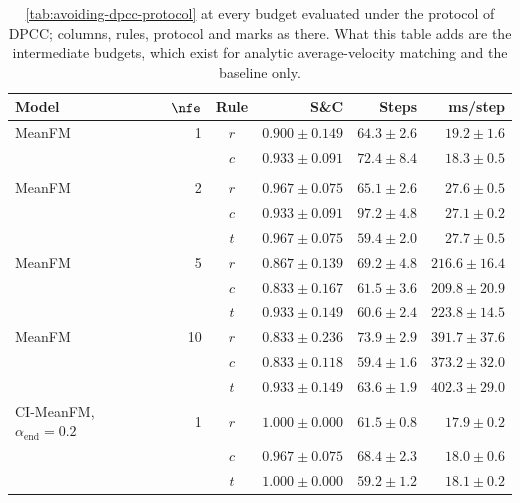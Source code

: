 \begin{table}[htpb]
  \caption[D3IL-avoiding at the protocol of DPCC, every budget]{\autoref{tab:avoiding-dpcc-protocol} at
  every budget evaluated under the protocol of \ac{DPCC}; columns, rules, protocol and marks as there.
  What this table adds are the intermediate budgets, which exist for analytic average-velocity matching
  and the baseline only.}
  \label{tab:app:avoiding-dpcc-full}
  \centering
  \footnotesize
  \begin{tabularx}{\linewidth}{@{}L r c rrr@{}}
    \toprule
    Model & $\nfe$ & Rule & S\&C & Steps & ms/step \\
    \midrule
    MeanFM     & 1 & $r$ & $0.900 \pm 0.149$ & $64.3 \pm 2.6$ & $19.2 \pm 1.6$ \\
                     &    & $c$ & $0.933 \pm 0.091$ & $72.4 \pm 8.4$ & $18.3 \pm 0.5$ \\
                     &    &  &  &  &   \\
    MeanFM     & 2 & $r$ & $0.967 \pm 0.075$ & $65.1 \pm 2.6$ & $27.6 \pm 0.5$ \\
                     &    & $c$ & $0.933 \pm 0.091$ & $97.2 \pm 4.8$ & $27.1 \pm 0.2$ \\
                     &    & $t$ & $0.967 \pm 0.075$ & $59.4 \pm 2.0$ & $27.7 \pm 0.5$ \\
    MeanFM     & 5 & $r$ & $0.867 \pm 0.139$ & $69.2 \pm 4.8$ & $216.6 \pm 16.4$ \\
                     &    & $c$ & $0.833 \pm 0.167$ & $61.5 \pm 3.6$ & $209.8 \pm 20.9$ \\
                     &    & $t$ & $0.933 \pm 0.149$ & $60.6 \pm 2.4$ & $223.8 \pm 14.5$ \\
    MeanFM     & 10 & $r$ & $0.833 \pm 0.236$ & $73.9 \pm 2.9$ & $391.7 \pm 37.6$ \\
                     &    & $c$ & $0.833 \pm 0.118$ & $59.4 \pm 1.6$ & $373.2 \pm 32.0$ \\
                     &    & $t$ & $0.933 \pm 0.149$ & $63.6 \pm 1.9$ & $402.3 \pm 29.0$ \\
    \midrule
    CI-MeanFM, $\alpha_{\mathrm{end}}=0.2$ & 1 & $r$ & $1.000 \pm 0.000$ & $61.5 \pm 0.8$ & $17.9 \pm 0.2$ \\
                     &    & $c$ & $0.967 \pm 0.075$ & $68.4 \pm 2.3$ & $18.0 \pm 0.6$ \\
                     &    & \textbf{$t$} & \textbf{$1.000 \pm 0.000$} & \textbf{$59.2 \pm 1.2$} & \textbf{$18.1 \pm 0.2$} \\

\end{tabularx}
\end{table}
